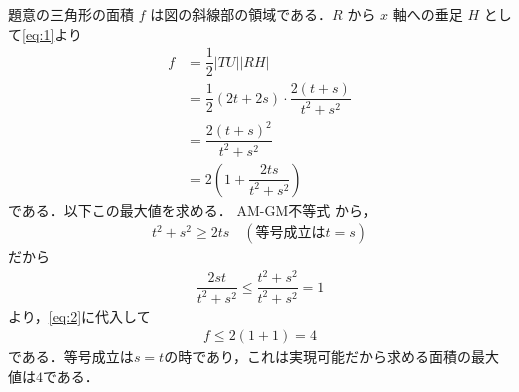 \documentclass[../../main.tex]{subfiles}
\begin{document}
題意の三角形の面積 $f$ は図の斜線部の領域である．$R$ から $x$ 軸への垂足 $H$ として\cref{eq:1}より
\begin{align}
  f &=\dfrac{1}{2}|TU||RH| \\
  &=\dfrac{1}{2}(2t+2s)\cdot \dfrac{2(t+s)}{t^2+s^2} \\
  &=\dfrac{2(t+s)^2}{t^2+s^2} \\
  &=2\left(1+\dfrac{2ts}{t^2+s^2}\right) \label{eq:2}
\end{align}
である．以下この最大値を求める．
AM-GM不等式 から，
\begin{align}
  t^2+s^2 \ge 2ts \quad (\text{等号成立は}t=s)
\end{align}
だから
\begin{align}
  \dfrac{2st}{t^2+s^2} \le \dfrac{t^2+s^2}{t^2+s^2} = 1
\end{align}
より，\cref{eq:2}に代入して
\begin{align}
  f \le 2(1+1)=4
\end{align}
である．等号成立は$s=t$の時であり，これは実現可能だから求める面積の最大値は$4$である．

\newpage
\end{document}
